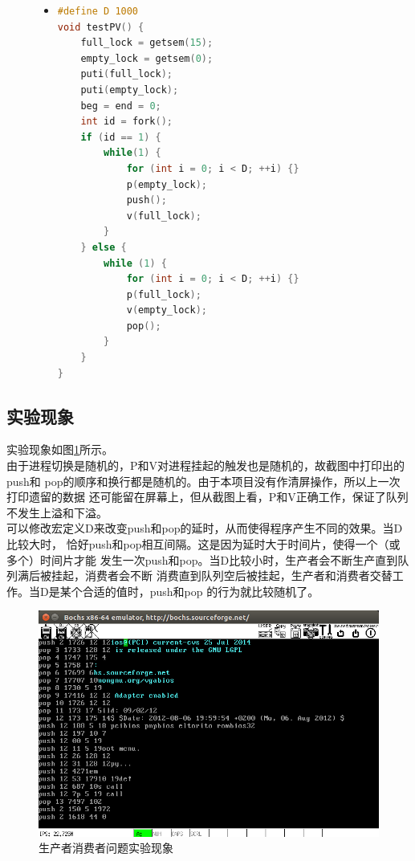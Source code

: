 \documentclass[a4paper]{article}
\begin{document}
\begin{figure}[!hbt]
\begin{itemize}
\item[] \begin{lstlisting}[language=C, label=lst:testcase, caption=生产者消费者问题测试代码]
#define D 1000
void testPV() {
    full_lock = getsem(15);
    empty_lock = getsem(0);
    puti(full_lock);
    puti(empty_lock);
    beg = end = 0;
    int id = fork();
    if (id == 1) {
        while(1) {
            for (int i = 0; i < D; ++i) {}
            p(empty_lock);
            push();
            v(full_lock);
        }        
    } else {
        while (1) {
            for (int i = 0; i < D; ++i) {}
            p(full_lock);
            v(empty_lock);
            pop();
        }
    }
}
\end{lstlisting}
\end{itemize}
\end{figure}
\subsection{实验现象}
实验现象如图\ref{fig:ex8finish}所示。\\ 

由于进程切换是随机的，P和V对进程挂起的触发也是随机的，故截图中打印出的push和
pop的顺序和换行都是随机的。由于本项目没有作清屏操作，所以上一次打印遗留的数据
还可能留在屏幕上，但从截图上看，P和V正确工作，保证了队列不发生上溢和下溢。\\ 

可以修改宏定义D来改变push和pop的延时，从而使得程序产生不同的效果。当D比较大时，
恰好push和pop相互间隔。这是因为延时大于时间片，使得一个（或多个）时间片才能
发生一次push和pop。当D比较小时，生产者会不断生产直到队列满后被挂起，消费者会不断
消费直到队列空后被挂起，生产者和消费者交替工作。当D是某个合适的值时，push和pop
的行为就比较随机了。

\begin{figure}[!hbt]
    \begin{center}
    \includegraphics[scale=0.6]{assets/ex8finish.png}
    \caption{生产者消费者问题实验现象\label{fig:ex8finish}} 
    \end{center} 
\end{figure} 
\end{document}
